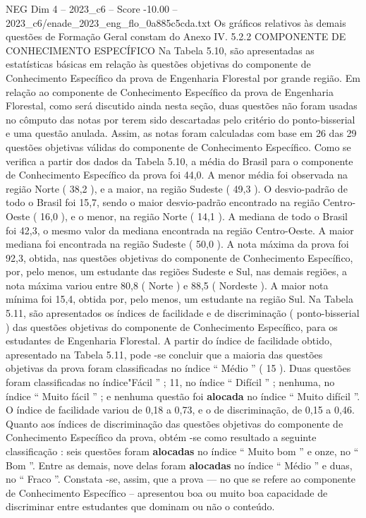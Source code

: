 \begin{textsample}{NEG Dim 4 – 2023\_c6 – Score -10.00 – 2023\_c6/enade\_2023\_eng\_flo\_0a885c5cda.txt}
Os gráficos relativos às demais questões de Formação Geral constam do Anexo IV. 5.2.2 COMPONENTE DE CONHECIMENTO ESPECÍFICO Na Tabela 5.10, são apresentadas as estatísticas básicas em relação às questões objetivas do componente de Conhecimento Específico da prova de Engenharia Florestal por grande região.
Em relação ao componente de Conhecimento Específico da prova de Engenharia Florestal, como será discutido ainda nesta seção, duas questões não foram usadas no cômputo das notas por terem sido descartadas pelo critério do ponto-bisserial e uma questão anulada.
Assim, as notas foram calculadas com base em 26 das 29 questões objetivas válidas do componente de Conhecimento Específico.
Como se verifica a partir dos dados da Tabela 5.10, a média do Brasil para o componente de Conhecimento Específico da prova foi 44,0.
A menor média foi observada na região Norte ( 38,2 ), e a maior, na região Sudeste ( 49,3 ).
O desvio-padrão de todo o Brasil foi 15,7, sendo o maior desvio-padrão encontrado na região Centro-Oeste ( 16,0 ), e o menor, na região Norte ( 14,1 ).
A mediana de todo o Brasil foi 42,3, o mesmo valor da mediana encontrada na região Centro-Oeste.
A maior mediana foi encontrada na região Sudeste ( 50,0 ).
A nota máxima da prova foi 92,3, obtida, nas questões objetivas do componente de Conhecimento Específico, por, pelo menos, um estudante das regiões Sudeste e Sul, nas demais regiões, a nota máxima variou entre 80,8 ( Norte ) e 88,5 ( Nordeste ).
A maior nota mínima foi 15,4, obtida por, pelo menos, um estudante na região Sul.
Na Tabela 5.11, são apresentados os índices de facilidade e de discriminação ( ponto-bisserial ) das questões objetivas do componente de Conhecimento Específico, para os estudantes de Engenharia Florestal.
A partir do índice de facilidade obtido, apresentado na Tabela 5.11, pode -se concluir que a maioria das questões objetivas da prova foram classificadas no índice “ Médio ” ( 15 ).
Duas questões foram classificadas no índice"Fácil ” ; 11, no índice “ Difícil ” ; nenhuma, no índice “ Muito fácil ” ; e nenhuma questão foi \textbf{alocada} no índice “ Muito difícil ”.
O índice de facilidade variou de 0,18 a 0,73, e o de discriminação, de 0,15 a 0,46.
Quanto aos índices de discriminação das questões objetivas do componente de Conhecimento Específico da prova, obtém -se como resultado a seguinte classificação : seis questões foram \textbf{alocadas} no índice “ Muito bom ” e onze, no “ Bom ”.
Entre as demais, nove delas foram \textbf{alocadas} no índice “ Médio ” e duas, no “ Fraco ”.
Constata -se, assim, que a prova — no que se refere ao componente de Conhecimento Específico – apresentou boa ou muito boa capacidade de discriminar entre estudantes que dominam ou não o conteúdo.

\end{textsample}
